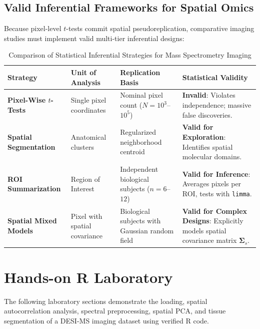 \documentclass[11pt,twoside,openright]{book}
\begin{document}
\subsection{Valid Inferential Frameworks for Spatial Omics}

Because pixel-level $t$-tests commit spatial pseudoreplication, comparative imaging studies must implement valid multi-tier inferential designs:

\begin{table}[ht]
\centering
\caption{Comparison of Statistical Inferential Strategies for Mass Spectrometry Imaging}
\label{tab:msi_inference}
\small
\begin{tabularx}{\textwidth}{l p{3.5cm} p{3.8cm} X}
\toprule
\textbf{Strategy} & \textbf{Unit of Analysis} & \textbf{Replication Basis} & \textbf{Statistical Validity} \\
\midrule
\textbf{Pixel-Wise $t$-Tests} & Single pixel coordinates & Nominal pixel count ($N = 10^3$--$10^5$) & \textbf{Invalid}: Violates independence; massive false discoveries. \\
\addlinespace
\textbf{Spatial Segmentation} & Anatomical clusters & Regularized neighborhood centroid & \textbf{Valid for Exploration}: Identifies spatial molecular domains. \\
\addlinespace
\textbf{ROI Summarization} & Region of Interest & Independent biological subjects ($n = 6$--$12$) & \textbf{Valid for Inference}: Averages pixels per ROI, tests with \texttt{limma}. \\
\addlinespace
\textbf{Spatial Mixed Models} & Pixel with spatial covariance & Biological subjects with Gaussian random field & \textbf{Valid for Complex Designs}: Explicitly models spatial covariance matrix $\boldsymbol{\Sigma}_s$. \\
\bottomrule
\end{tabularx}
\end{table}

\section{Hands-on R Laboratory}

The following laboratory sections demonstrate the loading, spatial autocorrelation analysis, spectral preprocessing, spatial PCA, and tissue segmentation of a DESI-MS imaging dataset using verified R code.
\end{document}
